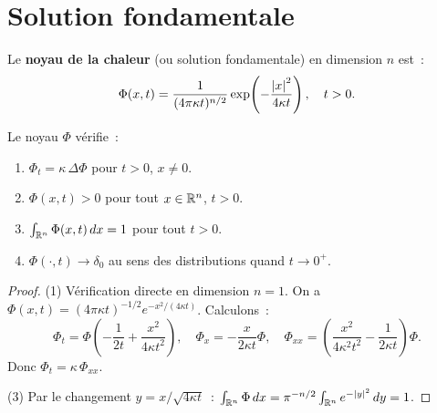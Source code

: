 \section{Solution fondamentale}

\begin{definition}
Le \textbf{noyau de la chaleur} (ou solution fondamentale) en dimension $n$ est~:
\begin{equation}\label{eq:noyau_chaleur}
    \Phi(x,t) = \frac{1}{(4\pi\kappa t)^{n/2}}
    \exp\!\left(-\frac{\left| x \right|^2}{4\kappa t}\right), \quad t > 0.
\end{equation}
\end{definition}

\begin{theoreme}
Le noyau $\Phi$ v\'erifie~:
\begin{enumerate}
    \item $\Phi_t = \kappa\, \Delta \Phi$ pour $t > 0$, $x \neq 0$.
    \item $\Phi(x,t) > 0$ pour tout $x \in \mathbb{R}^n$, $t > 0$.
    \item $\int_{\mathbb{R}^n} \Phi(x,t)\, dx = 1$ pour tout $t > 0$.
    \item $\Phi(\cdot, t) \to \delta_0$ au sens des distributions quand $t \to 0^+$.
\end{enumerate}
\end{theoreme}

\begin{proof}
(1) V\'erification directe en dimension $n = 1$. On a
$\Phi(x,t) = (4\pi\kappa t)^{-1/2} e^{-x^2/(4\kappa t)}$. Calculons~:
\[
    \Phi_t = \Phi\left(-\frac{1}{2t} + \frac{x^2}{4\kappa t^2}\right),
    \quad
    \Phi_x = -\frac{x}{2\kappa t}\Phi, \quad
    \Phi_{xx} = \left(\frac{x^2}{4\kappa^2 t^2} - \frac{1}{2\kappa t}\right)\Phi.
\]
Donc $\Phi_t = \kappa\, \Phi_{xx}$.

(3) Par le changement $y = x/\sqrt{4\kappa t}$~:
$\int_{\mathbb{R}^n} \Phi\, dx = \pi^{-n/2}\int_{\mathbb{R}^n} e^{-\left| y \right|^2}\, dy = 1$.
\end{proof}

\begin{center}
\end{center}

